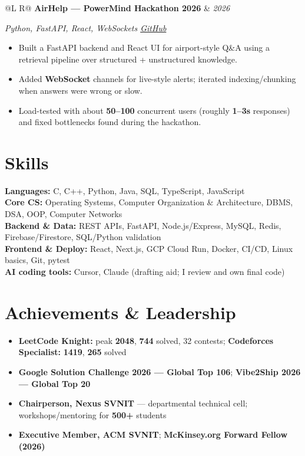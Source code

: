 \documentclass[a4paper,10pt]{article}
\makeatletter
\newcommand{\proj}[3]{%
  \vspace{1.5mm}
  \noindent\begin{tabularx}{\textwidth}{@{}L R@{}}
    \textbf{#1} & \textit{\small #2} \\
  \end{tabularx}\par
  {\small\textit{#3}}\par
  \vspace{0.5mm}%
}
\makeatother
\begin{document}
\proj{AirHelp --- PowerMind Hackathon 2026}{2026}
{Python, FastAPI, React, WebSockets \textbar{} \href{https://github.com/Ojas-Srivastava05/AirHelp-AI-Airport-Assistant}{GitHub}}
\begin{itemize}
  \item Built a FastAPI backend and React UI for airport-style Q\&A using a retrieval pipeline over structured + unstructured knowledge.
  \item Added \textbf{WebSocket} channels for live-style alerts; iterated indexing/chunking when answers were wrong or slow.
  \item Load-tested with about \textbf{50--100} concurrent users (roughly \textbf{1--3s} responses) and fixed bottlenecks found during the hackathon.
\end{itemize}

\section{Skills}
\noindent\small
\textbf{Languages:} C, C++, Python, Java, SQL, TypeScript, JavaScript \\[0.6mm]
\textbf{Core CS:} Operating Systems, Computer Organization \& Architecture, DBMS, DSA, OOP, Computer Networks \\[0.6mm]
\textbf{Backend \& Data:} REST APIs, FastAPI, Node.js/Express, MySQL, Redis, Firebase/Firestore, SQL/Python validation \\[0.6mm]
\textbf{Frontend \& Deploy:} React, Next.js, GCP Cloud Run, Docker, CI/CD, Linux basics, Git, pytest \\[0.6mm]
\textbf{AI coding tools:} Cursor, Claude (drafting aid; I review and own final code)

\section{Achievements \& Leadership}
\begin{itemize}
  \item \textbf{LeetCode Knight:} peak \textbf{2048}, \textbf{744} solved, 32 contests; \textbf{Codeforces Specialist:} \textbf{1419}, \textbf{265} solved
  \item \textbf{Google Solution Challenge 2026 --- Global Top 106}; \textbf{Vibe2Ship 2026 --- Global Top 20}
  \item \textbf{Chairperson, Nexus SVNIT} --- departmental technical cell; workshops/mentoring for \textbf{500+} students
  \item \textbf{Executive Member, ACM SVNIT}; \textbf{McKinsey.org Forward Fellow (2026)}
\end{itemize}
\end{document}
